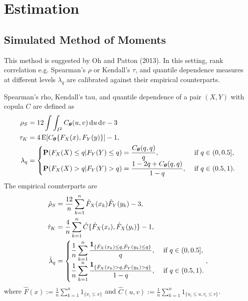 
\section{Estimation}\label{sec:estimation}

\subsection{Simulated Method of Moments}\label{subsec:simulated-method-of-moments}
This method is suggested by Oh and Patton (2013).
In this setting, rank correlation e.g. Spearman's $\rho$ or Kendall's $\tau$,
and quantile dependence measures at different levels $\lambda_q$
are calibrated against their empirical counterparts.\medskip

Spearman's rho, Kendall's tau, and quantile dependence of a pair $(X,Y)$
with copula $C$ are defined as
\begin{align}
  \rho_S &= 12 \int\int_{I^2} C_{\bm{\theta}}(u,v)\, {\rm d} u\, {\rm d} v-3\label{eq:rho_S}\\
  \tau_K &= 4\operatorname{E}[C_{\bm{\theta}}\{F_X(x), F_Y(y)\}]-1,\\
  \lambda_q &=
  \begin{cases}
    {\bf P}(F_X(X)\leq q| F_Y(Y)\leq q) = \displaystyle \frac{C_{\bm{\theta}}(q,q)}{q},
    &\text{ if } q\in (0,0.5],\\
    {\bf P}(F_X(X)>q|F_Y(Y)>q) =\displaystyle \frac{1-2q+C_{\bm{\theta}}(q,q)} {1-q},
    &\text{ if } q\in (0.5,1).
  \end{cases}
\end{align}\medskip
The empirical counterparts are
\begin{align*}
  \hat\rho_S &= \frac{12}{n} \sum_{k=1}^n \hat F_X(x_k) \hat F_Y(y_k)
               -3,\\
  \hat\tau_K &= \frac{4}{n}\sum_{k=1}^n \hat{C}\{\hat{F}_X(x_i),\hat{F}_X(y_i)\} -1 ,\\
  \hat\lambda_q &=
                  \begin{cases}
                    \displaystyle\frac{1}{n} \sum_{k=1}^n \frac{\textbf{1}_{\{\hat
                        F_X(x_k)\leq q, \hat F_Y(y_k)\leq q\}}} {q},
                    &\text { if } q\in (0, 0.5],\\
                    \displaystyle \frac{1}{n} \sum_{k=1}^n
                    \frac{\textbf{1}_{\{\hat F_X(x_k)>q, \hat F_Y(y_k)>q\}}}
                    {1-q}, &\text { if } q\in (0.5,1).
                  \end{cases},
\end{align*}
where $\hat{F}(x) := \frac{1}{n}\sum_{k=1}^n 1_{\{x_i\leq x\}}$ and
$\hat{C}(u,v) := \frac{1}{n}\sum_{k=1}^n 1_{\{u_i\leq u, v_i\leq v\}}$.\medskip

